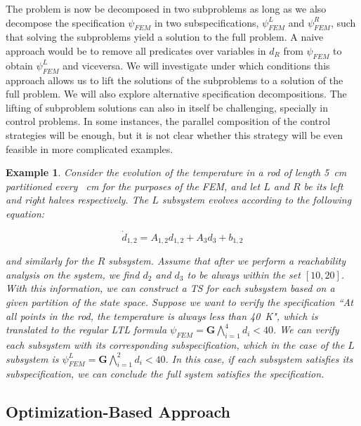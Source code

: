 \documentclass{article}
\newtheorem{example}{Example}
\newcommand{\Always}{\mathbf{G}}
\begin{document}
The problem is now be decomposed in two subproblems as long as we also
decompose the specification $\psi_{FEM}$ in two subspecifications,
$\psi_{FEM}^{L}$ and $\psi_{FEM}^{R}$, such that solving the subproblems yield a
solution to the full problem. A naive approach would be to remove all
predicates over variables in $d_R$ from $\psi_{FEM}$ to obtain $\psi_{FEM}^{L}$
and viceversa. We will investigate under which conditions this approach
allows us to lift the solutions of the subproblems to a solution of the full
problem. We will also explore alternative specification decompositions.
The lifting of subproblem solutions can also in itself be challenging, specially in
control problems. In some instances, the parallel composition of the control
strategies will be enough, but it is not clear whether this strategy will be
even feasible in more complicated examples.

\begin{example}
    Consider the evolution of the temperature in a rod of length \SI{5}{\cm} 
    partitioned every \SI{}{\cm} for the
    purposes of the FEM, and let $L$ and $R$ be its left and right halves
    respectively. The $L$ subsystem evolves according to the following equation:

    \begin{equation}
        \dot{d}_{1,2} = A_{1,2} d_{1,2} + A_3 d_3 + b_{1,2}
    \end{equation}

    and similarly for the $R$ subsystem. Assume that after we perform a reachability
    analysis on the system, we find $d_2$ and $d_3$ to be always within the set 
    $[10, 20]$. With this information, we can construct a TS for each subsystem
    based on a given partition of the state space. Suppose we want to verify the
    specification ``At all points in the rod, the temperature is always less
    than \SI{40}{\kelvin}", which is translated to the regular LTL formula
    $\psi_{FEM} = \Always \bigwedge_{i=1}^{4} d_i < 40$. We can verify each subsystem with
    its corresponding subspecification, which in the case of the $L$ subsystem
    is $\psi^L_{FEM} = \Always \bigwedge_{i=1}^{2} d_i < 40$. In this case, if
    each subsystem satisfies its subspecification, we can conclude the full
    system satisfies the specification.
\end{example}

\subsection{Optimization-Based Approach}
\label{sub:optimization_based_approach}
\end{document}
